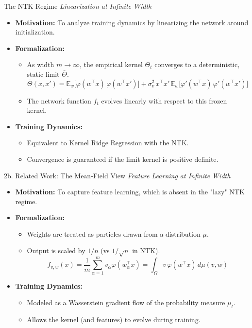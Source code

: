 \documentclass[10pt,aspectratio=169]{beamer}
\begin{document}
\begin{frame}{The NTK Regime}
	\textit{Linearization at Infinite Width}

	\begin{itemize}
		\item \textbf{Motivation:} To analyze training dynamics by linearizing the network around initialization.
		\item \textbf{Formalization:}
		      \begin{itemize}
			      \item As width $m \to \infty$, the empirical kernel $\Theta_t$ converges to a deterministic, static limit $\bar\Theta$.
			            \[
				            \bar\Theta(x,x')
				            =
				            \mathbb{E}_{w}\!\big[\varphi(w^\top x)\,\varphi(w^\top x')\big]
				            +
				            \sigma_v^2\,x^\top x'\,
				            \mathbb{E}_{w}\!\big[\varphi'(w^\top x)\,\varphi'(w^\top x')\big]
			            \]
			      \item The network function $f_t$ evolves linearly with respect to this frozen kernel.
		      \end{itemize}
		\item \textbf{Training Dynamics:}
		      \begin{itemize}
			      \item Equivalent to Kernel Ridge Regression with the NTK.
			      \item Convergence is guaranteed if the limit kernel is positive definite.
		      \end{itemize}
	\end{itemize}
\end{frame}

\begin{frame}{2b. Related Work: The Mean-Field View}
	\textit{Feature Learning at Infinite Width}

	\begin{itemize}
		\item \textbf{Motivation:} To capture feature learning, which is absent in the "lazy" NTK regime.
		\item \textbf{Formalization:}
		      \begin{itemize}
			      \item Weights are treated as particles drawn from a distribution $\mu$.
			      \item Output is scaled by $1/n$ (vs $1/\sqrt{n}$ in NTK).
			            \[
				            f_{v,w}(x)
				            = \frac{1}{m} \sum_{\alpha=1}^m v_\alpha \varphi(w_\alpha^\top x)
				            =\int_\Omega v\,\varphi(w^\top x)\,d\mu(v,w)
			            \]
		      \end{itemize}
		\item \textbf{Training Dynamics:}
		      \begin{itemize}
			      \item Modeled as a Wasserstein gradient flow of the probability measure $\mu_t$.
			      \item Allows the kernel (and features) to evolve during training.
		      \end{itemize}
	\end{itemize}
\end{frame}
\end{document}

